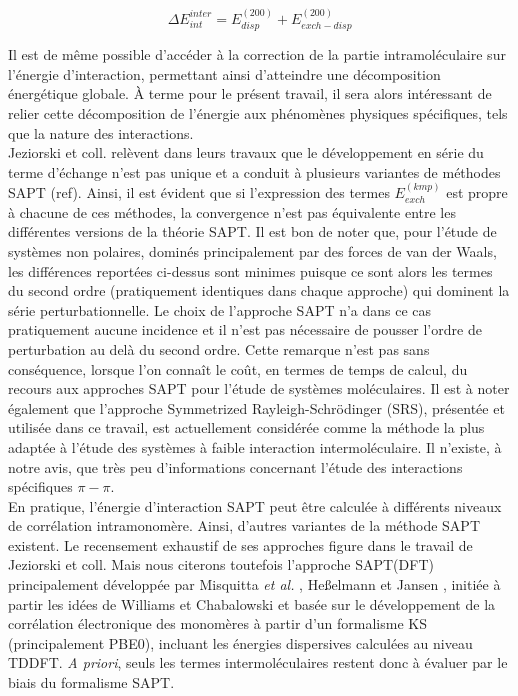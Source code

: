 	\begin{equation}
	\Delta E_{int}^{inter} =  E_{disp}^{(200)} + E_{exch-disp}^{(200)}
	\end{equation}
	
	Il est de même possible d’accéder à la correction de la partie intramoléculaire sur l’énergie d’interaction, permettant ainsi d’atteindre une décomposition énergétique globale. À terme pour le présent travail, il sera alors intéressant de relier cette décomposition de l'énergie aux phénomènes physiques spécifiques, tels que la nature des interactions. \\
	
	Jeziorski et coll. relèvent dans leurs travaux que le développement en série du terme d’échange n’est pas unique et a conduit à plusieurs variantes de méthodes SAPT (ref). Ainsi, il est évident que si l’expression des termes $E_{exch}^{(kmp)}$ est propre à chacune de ces méthodes, la convergence n'est pas équivalente entre les différentes versions de la théorie SAPT. Il est bon de noter que, pour l’étude de systèmes non polaires, dominés principalement par des forces de van der Waals, les différences reportées ci-dessus sont minimes puisque ce sont alors les termes du second ordre (pratiquement identiques dans chaque approche) qui dominent la série perturbationnelle. Le choix de l’approche SAPT n’a dans ce cas pratiquement aucune incidence et il n’est pas nécessaire de pousser l’ordre de perturbation au delà du second ordre. Cette remarque n’est pas sans conséquence, lorsque l’on connaît le coût, en termes de temps de calcul, du recours aux approches SAPT pour l’étude de systèmes moléculaires. Il est à noter également que l’approche Symmetrized Rayleigh-Schr\"{o}dinger (SRS), présentée et utilisée dans ce travail, est actuellement considérée comme la méthode la plus adaptée à l’étude des systèmes à faible interaction intermoléculaire. Il n’existe, à notre avis, que très peu d’informations concernant l’étude des interactions spécifiques $\pi-\pi$.\\
	
	
	En pratique, l’énergie d'interaction SAPT peut être calculée à différents niveaux de corrélation intramonomère. Ainsi, d’autres variantes de la méthode SAPT existent.
	Le recensement exhaustif de ses approches figure dans le travail de Jeziorski et coll. Mais nous citerons toutefois l’approche SAPT(DFT) principalement développée par 
	Misquitta \textit{et al.} \cite{misquitta2005intermolecular}, Heßelmann et Jansen \cite{hesselmann2002first}, initiée à partir les idées de Williams et Chabalowski \cite{williams2001using} et basée sur le développement de la corrélation électronique des monomères à partir d’un formalisme KS (principalement PBE0), incluant les énergies dispersives calculées au niveau TDDFT. \textit{A priori}, seuls les termes intermoléculaires restent donc à évaluer par le biais du formalisme SAPT.\\
	

